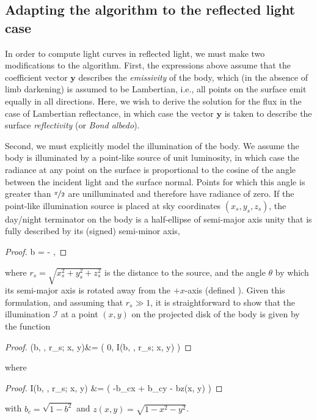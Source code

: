 \documentclass[modern]{aastex62}
\begin{document}
\subsection{Adapting the algorithm to the reflected light case}
\label{sec:starry-review}
%
In order to compute light curves in reflected light, we must make two
modifications to the \starry algorithm. First,
the expressions above assume that the coefficient vector
$\mathbf{y}$ describes the \emph{emissivity} of the body, which (in the
absence of limb darkening) is assumed to be Lambertian, i.e., all points on the
surface emit equally in all directions.
Here, we wish to derive the solution for the flux in the case of Lambertian
reflectance, in which case the vector $\mathbf{y}$ is taken to describe the
surface \emph{reflectivity} (or \emph{Bond albedo}).

Second, we must explicitly model the illumination of the body. We assume the
body is illuminated by a point-like source of unit luminosity, in which case
the radiance at any
point on the surface is proportional to the cosine of the angle between
the incident light and the surface normal. Points for which
this angle is greater than $\nicefrac{\pi}{2}$ are unilluminated and
therefore have radiance of zero.
%
If the point-like illumination source is placed at sky coordinates
$(x_s, y_s, z_s)$, the day/night terminator on the body is a half-ellipse
of semi-major axis unity that is fully described by its (signed) semi-minor
axis,
%
\begin{proof}{}
    \label{eq:b}
    b = -
    \quad,
\end{proof}
%
where $r_s = \sqrt{x_s^2 + y_s^2 + z_s^2}$ is the distance to the source,
%
and the angle $\theta$ by which its semi-major axis is rotated away from the
$+x$-axis (defined ).
Given this formulation, and assuming that
$r_s \gg 1$,
it is straightforward to show that the illumination
$\mathcal{I}$ at a point $(x, y)$ on the projected disk of the body is given
by the function
%
\begin{proof}{}
    \label{eq:illum}
    (b, \theta, r_s; x, y)&=
    \bigg( 0, I(b, \theta, r_s; x, y) \bigg)
\end{proof}
%
where
%
\begin{proof}{}
    \label{eq:illum_poly}
    I(b, \theta, r_s; x, y) &= 
    \bigg(
    -b_c\sin\theta x + b_c\cos\theta y - bz(x, y)
    \bigg)
\end{proof}
%
with $b_c = \sqrt{1 - b^2}$ and $z(x, y) = \sqrt{1 - x^2 - y^2}$.
\end{document}
